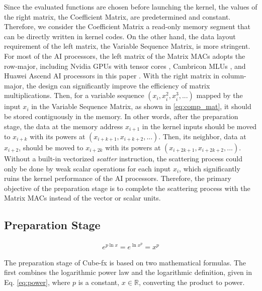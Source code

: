 Since the evaluated functions are chosen before launching the kernel, the values of the right matrix, the Coefficient Matrix, are predetermined and constant. Therefore, we consider the Coefficient Matrix a read-only memory segment that can be directly written in kernel codes. On the other hand, the data layout requirement of the left matrix, the Variable Sequence Matrix, is more stringent. For most of the AI processors, the left matrix of the Matrix MACs adopts the row-major, including Nvidia GPUs with tensor cores \cite{DBLP:conf/ipps/00020C20}, Cambricon MLUs \cite{cambricon}, and Huawei Ascend AI processors in this paper \cite{DBLP:conf/hotchips/LiaoTXZ19}. With the right matrix in column-major, the design can significantly improve the efficiency of matrix multiplications. Then, for a variable sequence $(x_{i}, x_{i}^2,  x_{i}^3, ...)$ mapped by the input $x_{i}$ in the Variable Sequence Matrix, as shown in \ref{eq:comp_mat}, it should be stored contiguously in the memory. In other words, after the preparation stage, the data at the memory address $x_{i + 1}$ in the kernel inputs should be moved to $x_{i + k}$ with its powers at $(x_{i + k + 1}, x_{i + k + 2}, ...)$. Then, its neighbor, data at $x_{i + 2}$, should be moved to $x_{i + 2k}$ with its powers at $(x_{i + 2k + 1}, x_{i + 2k + 2}, ...)$. Without a built-in vectorized \textit{scatter} instruction, the scattering process could only be done by weak scalar operations for each input $x_{i}$, which significantly ruins the kernel performance of the AI processors. Therefore, the primary objective of the preparation stage is to complete the scattering process with the Matrix MACs instead of the vector or scalar units.

\subsection{Preparation Stage}

\begin{equation}
    \label{eq:power}
    \begin{aligned}
        e^{p \ln x} = e^{\ln x^p} = x^p
    \end{aligned}
    \end{equation}

The preparation stage of Cube-fx is based on two mathematical formulas. The first combines the logarithmic power law and the logarithmic definition, given in Eq. \ref{eq:power}, where $p$ is a constant, $x \in \mathbb{R}$, converting the product to power.


